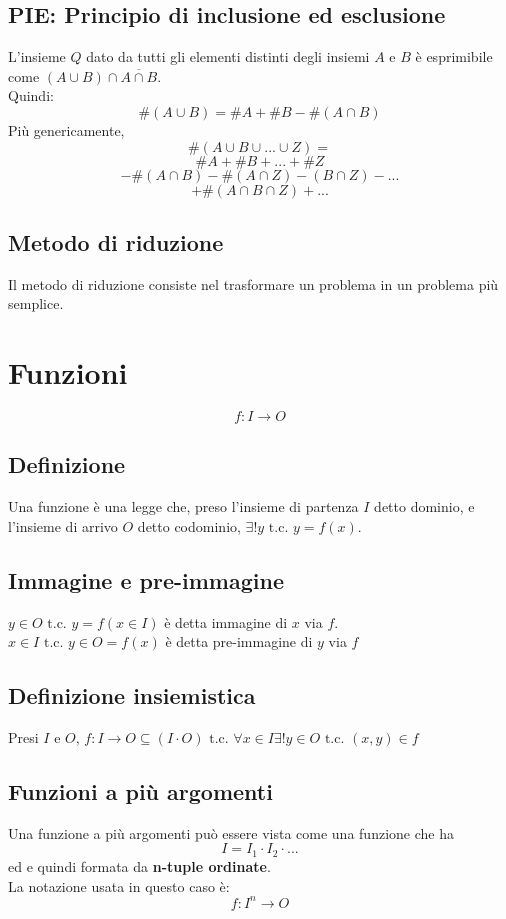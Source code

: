 \documentclass{report}
\begin{document}
    \subsection{PIE: Principio di inclusione ed esclusione}
        L'insieme $Q$ dato da tutti gli elementi distinti degli insiemi $A$ e $B$
        è esprimibile come $(A \cup B) \cap \overline{A \cap B}$. \\
        Quindi:
        $$\#\left(A \cup B\right) = \#A + \#B - \#\left(A \cap B\right)$$
        Più genericamente,
        $$\#\left(A \cup B \cup ... \cup Z\right) = $$
        $$\#A + \#B + ... + \#Z$$
        $$ - \#\left(A \cap B\right) - \#\left(A \cap Z\right) - \left(B \cap Z\right) - ... $$
        $$ + \#\left(A \cap B \cap Z\right) + ... $$
    \subsection{Metodo di riduzione}
        Il metodo di riduzione consiste nel trasformare un problema in un problema
        più semplice.
\newpage 
\section{Funzioni}
    $$ f: I \longrightarrow O $$
    \subsection{Definizione}
        Una funzione è una legge che, preso l'insieme di partenza $I$ detto dominio, e 
        l'insieme di arrivo $O$ detto codominio, $\exists!y \textrm{ t.c. } y = f\left(x\right)$.
    \subsection{Immagine e pre-immagine}
        $y \in O \textrm{ t.c. } y = f\left(x \in I\right)$ è detta immagine di $x$ via $f$. \\
        $x \in I \textrm{ t.c. } y \in O = f\left(x\right)$ è detta pre-immagine di $y$ via $f$
    \subsection{Definizione insiemistica}
        Presi $I$ e $O$, $f: I \longrightarrow O \subseteq (I \cdot O) \textrm { t.c. }
        \forall x \in I \exists! y \in O \textrm{ t.c. } \left(x,y\right) \in f$ \\
    \subsection{Funzioni a più argomenti}
        Una funzione a più argomenti può essere vista come una funzione che ha 
        $$I = I_1 \cdot I_2 \cdot ...$$
        ed e quindi formata da \textbf{n-tuple ordinate}. \\
        La notazione usata in questo caso è:
        $$f: I^n \longrightarrow O$$
\end{document}
